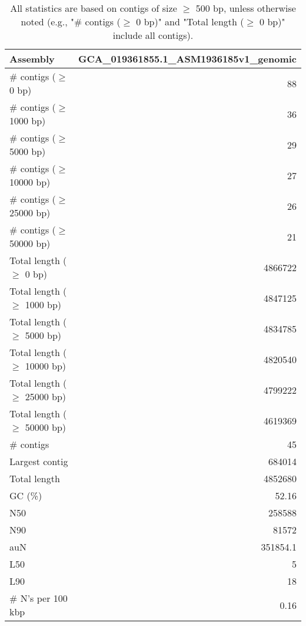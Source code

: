 \documentclass[12pt,a4paper]{article}
\begin{document}
\begin{table}[ht]
\begin{center}
\caption{All statistics are based on contigs of size $\geq$ 500 bp, unless otherwise noted (e.g., "\# contigs ($\geq$ 0 bp)" and "Total length ($\geq$ 0 bp)" include all contigs).}
\begin{tabular}{|l*{1}{|r}|}
\hline
Assembly & GCA\_019361855.1\_ASM1936185v1\_genomic \\ \hline
\# contigs ($\geq$ 0 bp) & 88 \\ \hline
\# contigs ($\geq$ 1000 bp) & 36 \\ \hline
\# contigs ($\geq$ 5000 bp) & 29 \\ \hline
\# contigs ($\geq$ 10000 bp) & 27 \\ \hline
\# contigs ($\geq$ 25000 bp) & 26 \\ \hline
\# contigs ($\geq$ 50000 bp) & 21 \\ \hline
Total length ($\geq$ 0 bp) & 4866722 \\ \hline
Total length ($\geq$ 1000 bp) & 4847125 \\ \hline
Total length ($\geq$ 5000 bp) & 4834785 \\ \hline
Total length ($\geq$ 10000 bp) & 4820540 \\ \hline
Total length ($\geq$ 25000 bp) & 4799222 \\ \hline
Total length ($\geq$ 50000 bp) & 4619369 \\ \hline
\# contigs & 45 \\ \hline
Largest contig & 684014 \\ \hline
Total length & 4852680 \\ \hline
GC (\%) & 52.16 \\ \hline
N50 & 258588 \\ \hline
N90 & 81572 \\ \hline
auN & 351854.1 \\ \hline
L50 & 5 \\ \hline
L90 & 18 \\ \hline
\# N's per 100 kbp & 0.16 \\ \hline
\end{tabular}
\end{center}
\end{table}
\end{document}
